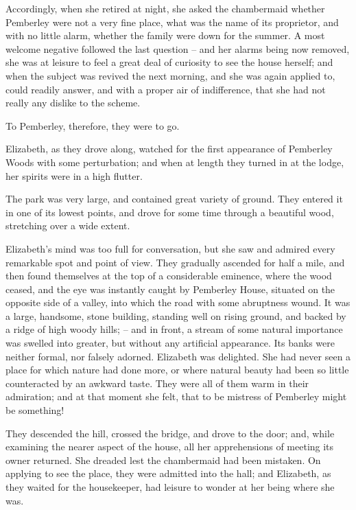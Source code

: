 Accordingly, when she retired at night, she asked the
chambermaid whether Pemberley were not a very fine
place, what was the name of its proprietor, and with no
little alarm, whether the family were down for the summer.
A most welcome negative followed the last question -- and
her alarms being now removed, she was at leisure to
feel a great deal of curiosity to see the house herself;
and when the subject was revived the next morning, and
she was again applied to, could readily answer, and with
a proper air of indifference, that she had not really any
dislike to the scheme.

To Pemberley, therefore, they were to go.




Elizabeth, as they drove along, watched for the first
appearance of Pemberley Woods with some perturbation;
and when at length they turned in at the lodge, her
spirits were in a high flutter.

The park was very large, and contained great variety
of ground. They entered it in one of its lowest points,
and drove for some time through a beautiful wood,
stretching over a wide extent.

Elizabeth’s mind was too full for conversation, but she
saw and admired every remarkable spot and point of
view. They gradually ascended for half a mile, and then
found themselves at the top of a considerable eminence,
where the wood ceased, and the eye was instantly caught
by Pemberley House, situated on the opposite side of
a valley, into which the road with some abruptness wound.
It was a large, handsome, stone building, standing well on
rising ground, and backed by a ridge of high woody hills; -- and
in front, a stream of some natural importance was
swelled into greater, but without any artificial appearance.
Its banks were neither formal, nor falsely adorned. Elizabeth
was delighted. She had never seen a place for which
nature had done more, or where natural beauty had been
so little counteracted by an awkward taste. They were
all of them warm in their admiration; and at that moment
she felt, that to be mistress of Pemberley might be
something!

They descended the hill, crossed the bridge, and drove
to the door; and, while examining the nearer aspect of
the house, all her apprehensions of meeting its owner
returned. She dreaded lest the chambermaid had been
mistaken. On applying to see the place, they were
admitted into the hall; and Elizabeth, as they waited
for the housekeeper, had leisure to wonder at her being
where she was.

